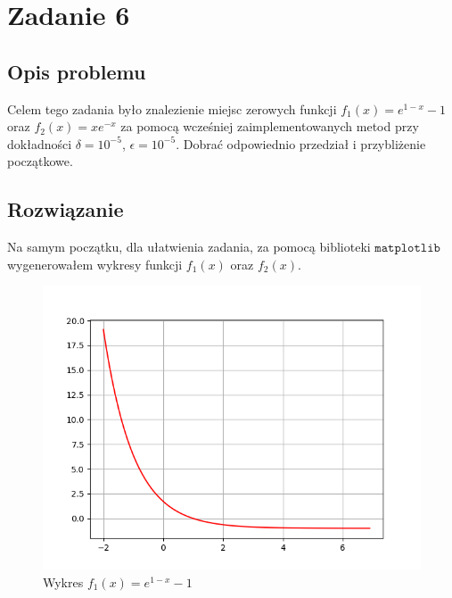 \section{Zadanie 6}
\subsection{Opis problemu}
Celem tego zadania było znalezienie miejsc zerowych funkcji $ f_1(x) = e^{1 - x} - 1 $ oraz $ f_2(x) = xe^{-x} $ za pomocą wcześniej zaimplementowanych metod przy dokładności $ \delta = 10^{-5}$, $\epsilon = 10^{-5}$. Dobrać odpowiednio przedział i przybliżenie początkowe.
\subsection{Rozwiązanie}

Na samym początku, dla ułatwienia zadania, za pomocą biblioteki $ \texttt{matplotlib} $ wygenerowałem wykresy funkcji $ f_1(x)$ oraz $f_2(x)$.

\begin{figure}[!htbp]
  \centering  
  \includegraphics[totalheight=6cm]{../plots/ex6_f_1.png}
  \caption{Wykres $f_1(x) = e^{1 - x} - 1$}
\end{figure}

